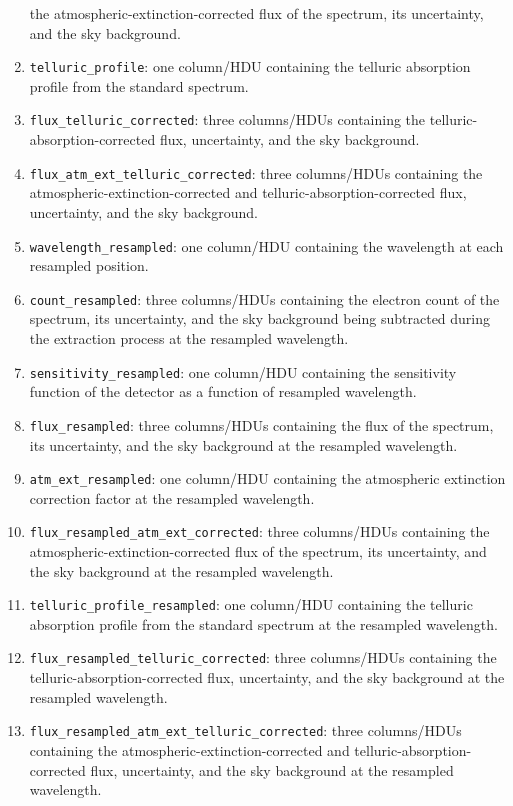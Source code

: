 \documentclass[linenumbers, twocolumn]{aastex631}
\begin{document}
\begin{enumerate}
    the atmospheric-extinction-corrected flux of the spectrum, its
    uncertainty, and the sky background.
    \item \texttt{telluric\_profile}: one column/HDU containing the telluric
    absorption profile from the standard spectrum.
    \item \texttt{flux\_telluric\_corrected}: three columns/HDUs containing
    the telluric-absorption-corrected flux, uncertainty, and the sky
    background.
    \item \texttt{flux\_atm\_ext\_telluric\_corrected}: three columns/HDUs
    containing the atmospheric-extinction-corrected and telluric-absorption-corrected flux,
    uncertainty, and the sky background.
    \item \texttt{wavelength\_resampled}: one column/HDU containing the
    wavelength at each resampled position.
    \item \texttt{count\_resampled}: three columns/HDUs containing the
    electron count of the spectrum, its uncertainty, and the sky background
    being subtracted during the extraction process at the resampled wavelength.
    \item \texttt{sensitivity\_resampled}: one column/HDU containing the
    sensitivity function of the detector as a function of resampled wavelength.
    \item \texttt{flux\_resampled}: three columns/HDUs containing the
    flux of the spectrum, its uncertainty, and the sky background at the
    resampled wavelength.
    \item \texttt{atm\_ext\_resampled}: one column/HDU containing the
    atmospheric extinction correction factor at the resampled wavelength.
    \item \texttt{flux\_resampled\_atm\_ext\_corrected}: three columns/HDUs
    containing the atmospheric-extinction-corrected flux of the spectrum, its
    uncertainty, and the sky background at the resampled wavelength.
    \item \texttt{telluric\_profile\_resampled}: one column/HDU containing
    the telluric absorption profile from the standard spectrum at the resampled
    wavelength.
    \item \texttt{flux\_resampled\_telluric\_corrected}: three columns/HDUs
    containing the telluric-absorption-corrected flux, uncertainty, and the sky
    background at the resampled wavelength.
    \item \texttt{flux\_resampled\_atm\_ext\_telluric\_corrected}: three
    columns/HDUs containing the atmospheric-extinction-corrected and
    telluric-absorption-corrected flux, uncertainty, and the sky background
    at the resampled wavelength.
\end{enumerate}
\end{document}
